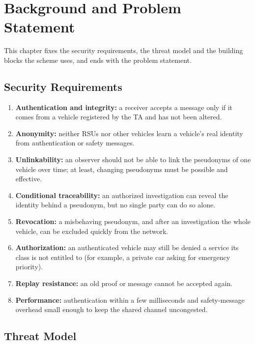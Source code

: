 \chapter{Background and Problem Statement}\label{ch:background}

This chapter fixes the security requirements, the threat model and the building blocks the scheme
uses, and ends with the problem statement.

\section{Security Requirements}

\begin{enumerate}
  \item \textbf{Authentication and integrity:} a receiver accepts a message only if it comes from a
  vehicle registered by the TA and has not been altered.
  \item \textbf{Anonymity:} neither RSUs nor other vehicles learn a vehicle's real identity from
  authentication or safety messages.
  \item \textbf{Unlinkability:} an observer should not be able to link the pseudonyms of one vehicle
  over time; at least, changing pseudonyms must be possible and effective.
  \item \textbf{Conditional traceability:} an authorized investigation can reveal the identity behind
  a pseudonym, but no single party can do so alone.
  \item \textbf{Revocation:} a misbehaving pseudonym, and after an investigation the whole vehicle,
  can be excluded quickly from the network.
  \item \textbf{Authorization:} an authenticated vehicle may still be denied a service its class is
  not entitled to (for example, a private car asking for emergency priority).
  \item \textbf{Replay resistance:} an old proof or message cannot be accepted again.
  \item \textbf{Performance:} authentication within a few milliseconds and safety-message overhead
  small enough to keep the shared channel uncongested.
\end{enumerate}

\section{Threat Model}\label{sec:threat}

